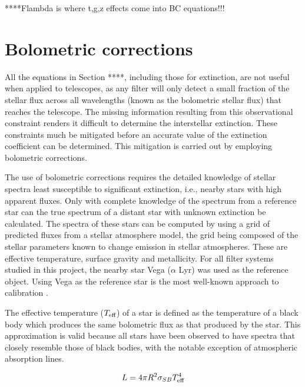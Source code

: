 \documentclass[12pt, a4paper]{report}
\begin{document}
****Flambda is where t,g,z effects come into BC equations!!!

\section{Bolometric corrections} \label{BC_theory}
All the equations in Section ****, including those for extinction, are not useful when applied to telescopes, as any filter will only detect a small fraction of the stellar flux across all wavelengths (known as the bolometric stellar flux) that reaches the telescope. The missing information resulting from this observational constraint renders it difficult to determine the interstellar extinction. These constraints much be mitigated before an accurate value of the extinction coefficient can be determined. This mitigation is carried out by employing bolometric corrections.

The use of bolometric corrections requires the detailed knowledge of stellar spectra least susceptible to significant extinction, i.e., nearby stars with high apparent fluxes. Only with complete knowledge of the spectrum from a reference star can the true spectrum of a distant star with unknown extinction be calculated. The spectra of these stars can be computed by using a grid of predicted fluxes from a stellar atmosphere model, the grid being composed of the stellar parameters known to change emission in stellar atmospheres. These are effective temperature, surface gravity and metallicity. For all filter systems studied in this project, the nearby star Vega ($\alpha$ Lyr) was used as the reference object. Using Vega as the reference star is the most well-known approach to calibration \citep{2014MNRAS.444..392C}.

The effective temperature ($T_{\textnormal{eff}}$) of a star is defined as the temperature of a black body which produces the same bolometric flux as that produced by the star. This approximation is valid because all stars have been observed to have spectra that closely resemble those of black bodies, with the notable exception of atmospheric absorption lines.

\begin{equation}
L = 4 \pi R^{2} \sigma_{SB} T_{\textnormal{eff}}^{4}
\label{Teff_def}
\end{equation}
\end{document}
